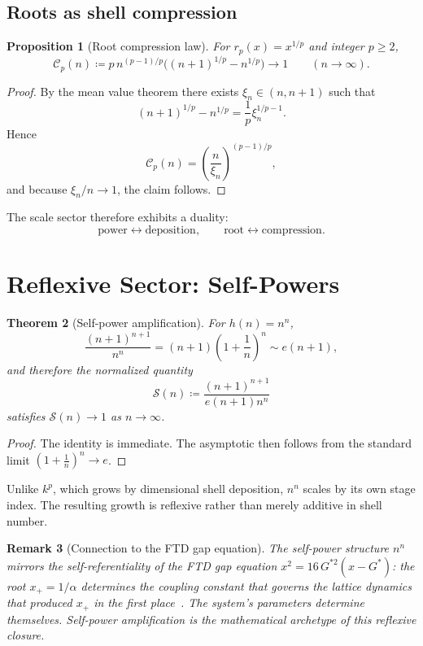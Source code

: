 \documentclass[11pt]{article}
\theoremstyle{tight}
\newtheorem{theorem}{Theorem}[section]
\newtheorem{proposition}[theorem]{Proposition}
\theoremstyle{plainroman}
\newtheorem{remark}[theorem]{Remark}
\begin{document}
\subsection{Roots as shell compression}
\begin{proposition}[Root compression law]
For $r_p(x)=x^{1/p}$ and integer $p\ge 2$,
\[
\mathcal C_p(n)\coloneqq p\,n^{(p-1)/p}\bigl((n+1)^{1/p}-n^{1/p}\bigr) \to 1
\qquad (n\to\infty).
\]
\end{proposition}
\begin{proof}
By the mean value theorem there exists $\xi_n\in(n,n+1)$ such that
\[
(n+1)^{1/p}-n^{1/p}=\frac{1}{p}\xi_n^{1/p-1}.
\]
Hence
\[
\mathcal C_p(n)=\left(\frac{n}{\xi_n}\right)^{(p-1)/p},
\]
and because $\xi_n/n\to 1$, the claim follows.
\end{proof}
The scale sector therefore exhibits a duality:
\[
\text{power} \leftrightarrow \text{deposition},
\qquad
\text{root} \leftrightarrow \text{compression}.
\]

\section{Reflexive Sector: Self-Powers}

\begin{theorem}[Self-power amplification]
For $h(n)=n^n$,
\[
\frac{(n+1)^{n+1}}{n^n}=(n+1)\left(1+\frac1n\right)^n \sim e(n+1),
\]
and therefore the normalized quantity
\[
\mathcal S(n)\coloneqq \frac{(n+1)^{n+1}}{e(n+1)n^n}
\]
satisfies $\mathcal S(n)\to 1$ as $n\to\infty$.
\end{theorem}
\begin{proof}
The identity is immediate. The asymptotic then follows from the standard limit $\left(1+\frac1n\right)^n\to e$.
\end{proof}
Unlike $k^p$, which grows by dimensional shell deposition, $n^n$ scales by its own stage index.
The resulting growth is reflexive rather than merely additive in shell number.

\begin{remark}[Connection to the FTD gap equation]
The self-power structure $n^n$ mirrors the self-referentiality of the FTD gap equation $x^2=16\,G^{*2}(x-G^*)$: the root $x_+=1/\alpha$ determines the coupling constant that governs the lattice dynamics that produced $x_+$ in the first place~\cite{ftdvnc}.
The system's parameters determine themselves.
Self-power amplification is the mathematical archetype of this reflexive closure.
\end{remark}
\end{document}
